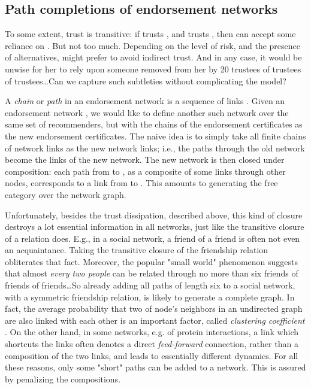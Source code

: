 \documentclass{llncs}
\begin{document}
\subsection{Path completions of endorsement networks}
To some extent, trust is transitive: if  trusts , and  trusts , then  can accept some reliance on . But not too much. Depending on the level of risk, and the presence of alternatives,  might prefer to avoid indirect trust. And in any case, it would be unwise for her to rely upon someone removed from her by 20 trustees of trustees of trustees\ldots Can we capture such subtleties without complicating the model?

A {\em chain\/} or {\em path\/}  in an endorsement network  is a sequence of  links 
.
Given an endorsement network , we would like to define another such network  over the same set of recommenders, but with the chains of the endorsement certificates as the new endorsement certificates. The naive idea is to simply take all finite chains of network links as the new network links; i.e., the paths through the old network become the links of the new network. The new network is then closed under composition: each path from  to , as a composite of some links through other nodes, corresponds to a link from  to . This amounts to generating the free category over the network graph. 

Unfortunately, besides the trust dissipation, described above, this kind of closure destroys a lot essential information in all networks, just like the transitive closure of a relation does. E.g., in a social network, a friend of a friend is often not even an acquaintance. Taking the transitive closure of the friendship relation 
obliterates that fact. Moreover, the popular "small world" phenomenon 
suggests that almost {\em every two people\/} can be related through 
no more than six friends of friends of friends\ldots So already adding 
all paths of length six to a social network, with a symmetric friendship 
relation, is likely to generate a complete graph. In fact, the average 
probability that two of node's neighbors in an undirected graph are 
also linked with each other is an important factor, called {\em 
clustering coefficient\/} \cite{Watts-Strogatz}. On the other hand, in 
some networks, e.g. of protein interactions, a link  
which shortcuts the links  often denotes a 
direct {\em feed-forward} connection, rather than a composition of the 
two links, and leads to essentially different dynamics. For all these reasons, only some "short" paths can be added to a network. This is assured by penalizing the compositions.
\end{document}
